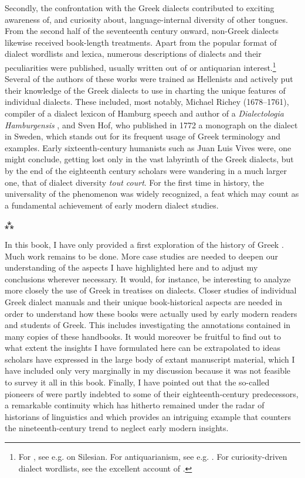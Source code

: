 Secondly, the confrontation with the Greek dialects contributed to exciting awareness of, and curiosity about, language-internal diversity of other tongues. From the second half of the seventeenth century onward, non-Greek dialects likewise received book-length treatments. Apart from the popular format of dialect wordlists and lexica, numerous descriptions of  dialects and their peculiarities were published, usually written out of  or antiquarian interest.\footnote{For , see e.g. \citet{Meisner1705} on Silesian. For antiquarianism, see e.g. \citet{Oberlin1775}. For curiosity-driven dialect wordlists, see the excellent account of \citet{Considine2017}.} Several of the authors of these works were trained as Hellenists and actively put their knowledge of the Greek dialects to use in charting the unique features of individual dialects. These included, most notably, Michael Richey (1678–1761), compiler of a dialect lexicon of Hamburg speech \citep{Richey1743} and author of a \textit{Dialectologia Hamburgensis} \citep{Richey1755}, and Sven Hof, who published in 1772 a monograph on the  dialect in Sweden, which stands out for its frequent usage of Greek terminology and examples. Early sixteenth-century humanists such as Juan Luis Vives were, one might conclude, getting lost only in the vast labyrinth of the Greek dialects, but by the end of the eighteenth century scholars were wandering in a much larger one, that of dialect diversity \textit{tout court}. For the first time in history, the universality of the phenomenon was widely recognized, a feat which may count as a fundamental achievement of early modern dialect studies.

\begin{center}
\large⁂
\end{center}

\noindent In this book, I have only provided a first exploration of the history of Greek . Much work remains to be done. More case studies are needed to deepen our understanding of the aspects I have highlighted here and to adjust my conclusions wherever necessary. It would, for instance, be interesting to analyze more closely the use of Greek in treatises on  dialects. Closer studies of individual Greek dialect manuals and their unique book-historical aspects are needed in order to understand how these books were actually used by early modern readers and students of Greek. This includes investigating the annotations contained in many copies of these handbooks. It would moreover be fruitful to find out to what extent the insights I have formulated here can be extrapolated to ideas scholars have expressed in the large body of extant manuscript material, which I have included only very marginally in my discussion because it was not feasible to survey it all in this book. Finally, I have pointed out that the so-called pioneers of   were partly indebted to some of their eighteenth-century predecessors, a remarkable continuity which has hitherto remained under the radar of historians of linguistics and which provides an intriguing example that counters the nineteenth-century trend to neglect early modern insights.



